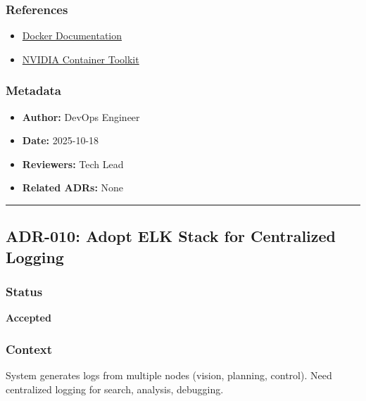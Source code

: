 \documentclass[
]{article}
\providecommand{\tightlist}{%
  \setlength{\itemsep}{0pt}\setlength{\parskip}{0pt}}
\begin{document}
\hypertarget{references-8}{%
\subsubsection{References}\label{references-8}}

\begin{itemize}
\tightlist
\item
  \href{https://docs.docker.com/}{Docker Documentation}
\item
  \href{https://github.com/NVIDIA/nvidia-docker}{NVIDIA Container
  Toolkit}
\end{itemize}

\hypertarget{metadata-8}{%
\subsubsection{Metadata}\label{metadata-8}}

\begin{itemize}
\tightlist
\item
  \textbf{Author:} DevOps Engineer
\item
  \textbf{Date:} 2025-10-18
\item
  \textbf{Reviewers:} Tech Lead
\item
  \textbf{Related ADRs:} None
\end{itemize}

\begin{center}\rule{0.5\linewidth}{0.5pt}\end{center}

\hypertarget{adr-010-adopt-elk-stack-for-centralized-logging}{%
\subsection{ADR-010: Adopt ELK Stack for Centralized
Logging}\label{adr-010-adopt-elk-stack-for-centralized-logging}}

\hypertarget{status-9}{%
\subsubsection{Status}\label{status-9}}

\textbf{Accepted}

\hypertarget{context-9}{%
\subsubsection{Context}\label{context-9}}

System generates logs from multiple nodes (vision, planning, control).
Need centralized logging for search, analysis, debugging.
\end{document}
